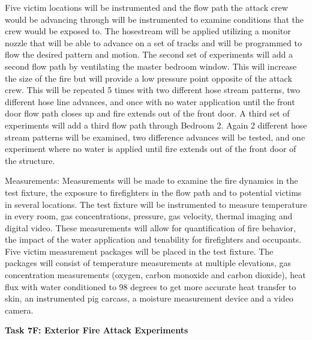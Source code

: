 \documentclass{article}
\begin{document}
\begin{itemize}
Five victim locations will be instrumented and the flow path the attack crew would be advancing through will be instrumented to examine conditions that the crew would be exposed to. The hosestream will be applied utilizing a monitor nozzle that will be able to advance on a set of tracks and will be programmed to flow the desired pattern and motion. The second set of experiments will add a second flow path by ventilating the master bedroom window. This will increase the size of the fire but will provide a low pressure point opposite of the attack crew. This will be repeated 5 times with two different hose stream patterns, two different hose line advances, and once with no water application until the front door flow path closes up and fire extends out of the front door. A third set of experiments will add a third flow path through Bedroom 2. Again 2 different hose stream patterns will be examined, two difference advances will be tested, and one experiment where no water is applied until fire extends out of the front door of the structure.

Measurements: Measurements will be made to examine the fire dynamics in the test fixture, the exposure to firefighters in the flow path and to potential victims in several locations. The test fixture will be instrumented to measure temperature in every room, gas concentrations, pressure, gas velocity, thermal imaging and digital video. These measurements will allow for quantification of fire behavior, the impact of the water application and tenability for firefighters and occupants. Five victim measurement packages will be placed in the test fixture.  The packages will consist of temperature measurements at multiple elevations, gas concentration measurements (oxygen, carbon monoxide and carbon dioxide), heat flux with water conditioned to 98 degrees to get more accurate heat transfer to skin, an instrumented pig carcass, a moisture measurement device and a video camera. 
\vspace*{\baselineskip}

\subitem \bf{Task 7F:  Exterior Fire Attack Experiments}
\normalfont
\vspace*{\baselineskip}


\end{itemize}
\end{document}
